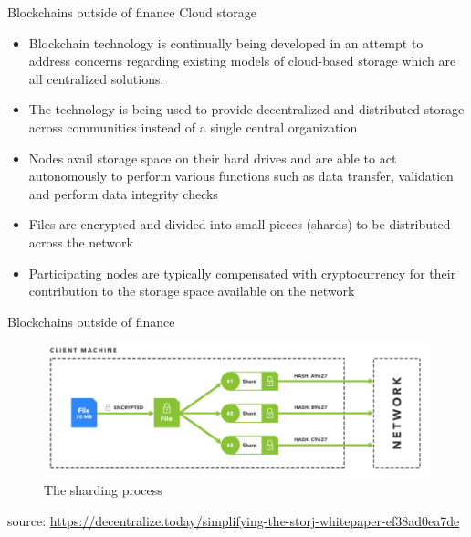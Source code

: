 \documentclass[9pt]{beamer}
\begin{document}

\begin{frame}{Blockchains outside of finance}
	Cloud storage
	\begin{itemize}
		\item Blockchain technology is continually being developed in an attempt to address concerns regarding existing models of cloud-based storage which are all centralized solutions.
		\item The technology is being used to provide decentralized and distributed storage across communities instead of a single central organization
		\item Nodes avail storage space on their hard drives and are able to act autonomously to perform various functions such as data transfer, validation and perform data integrity checks
		\item Files are encrypted and divided into small pieces (shards) to be distributed across the network
		\item Participating nodes are typically compensated with cryptocurrency for their contribution to the storage space available on the network
	\end{itemize}
\end{frame}


\begin{frame}{Blockchains outside of finance}
	\begin{figure}[]
		\centering
		\includegraphics  [scale=0.3]{Images/storj}
		\caption{The sharding process}
	\end{figure}
		\begin{scriptsize}
		source: \href{https://decentralize.today/simplifying-the-storj-whitepaper-ef38ad0ea7de}{https://decentralize.today/simplifying-the-storj-whitepaper-ef38ad0ea7de}
	\end{scriptsize}
\end{frame}
\end{document}
